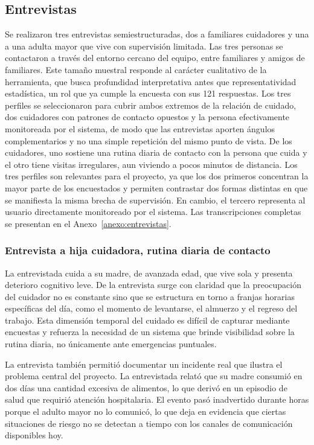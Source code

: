 \subsection{Entrevistas}

Se realizaron tres entrevistas semiestructuradas, dos a familiares cuidadores y una a una adulta mayor que vive con supervisión limitada.
Las tres personas se contactaron a través del entorno cercano del equipo, entre familiares y amigos de familiares.
Este tamaño muestral responde al carácter cualitativo de la herramienta, que busca profundidad interpretativa antes que representatividad estadística, un rol que ya cumple la encuesta con sus 121 respuestas.
Los tres perfiles se seleccionaron para cubrir ambos extremos de la relación de cuidado, dos cuidadores con patrones de contacto opuestos y la persona efectivamente monitoreada por el sistema, de modo que las entrevistas aporten ángulos complementarios y no una simple repetición del mismo punto de vista.
De los cuidadores, uno sostiene una rutina diaria de contacto con la persona que cuida y el otro tiene visitas irregulares, aun viviendo a pocos minutos de distancia.
Los tres perfiles son relevantes para el proyecto, ya que los dos primeros concentran la mayor parte de los encuestados y permiten contrastar dos formas distintas en que se manifiesta la misma brecha de supervisión.
En cambio, el tercero representa al usuario directamente monitoreado por el sistema.
Las transcripciones completas se presentan en el Anexo~\ref{anexo:entrevistas}.

\subsubsection{Entrevista a hija cuidadora, rutina diaria de contacto}

La entrevistada cuida a su madre, de avanzada edad, que vive sola y presenta deterioro cognitivo leve.
De la entrevista surge con claridad que la preocupación del cuidador no es constante sino que se estructura en torno a franjas horarias específicas del día, como el momento de levantarse, el almuerzo y el regreso del trabajo.
Esta dimensión temporal del cuidado es difícil de capturar mediante encuestas y refuerza la necesidad de un sistema que brinde visibilidad sobre la rutina diaria, no únicamente ante emergencias puntuales.

La entrevista también permitió documentar un incidente real que ilustra el problema central del proyecto.
La entrevistada relató que su madre consumió en dos días una cantidad excesiva de alimentos, lo que derivó en un episodio de salud que requirió atención hospitalaria.
El evento pasó inadvertido durante horas porque el adulto mayor no lo comunicó, lo que deja en evidencia que ciertas situaciones de riesgo no se detectan a tiempo con los canales de comunicación disponibles hoy.

